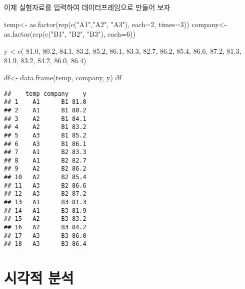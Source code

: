 \documentclass[
]{book}
\newenvironment{Shaded}{\begin{snugshade}}{\end{snugshade}}
\newcommand{\AttributeTok}[1]{\textcolor[rgb]{0.77,0.63,0.00}{#1}}
\newcommand{\DecValTok}[1]{\textcolor[rgb]{0.00,0.00,0.81}{#1}}
\newcommand{\FloatTok}[1]{\textcolor[rgb]{0.00,0.00,0.81}{#1}}
\newcommand{\FunctionTok}[1]{\textcolor[rgb]{0.00,0.00,0.00}{#1}}
\newcommand{\NormalTok}[1]{#1}
\newcommand{\OtherTok}[1]{\textcolor[rgb]{0.56,0.35,0.01}{#1}}
\newcommand{\StringTok}[1]{\textcolor[rgb]{0.31,0.60,0.02}{#1}}
\begin{document}
이제 실험자료를 입력하여 데이터프레임으로 만들어 보자

\begin{Shaded}
\begin{Highlighting}[]
\NormalTok{temp}\OtherTok{\textless{}{-}} \FunctionTok{as.factor}\NormalTok{(}\FunctionTok{rep}\NormalTok{(}\FunctionTok{c}\NormalTok{(}\StringTok{"A1"}\NormalTok{,}\StringTok{"A2"}\NormalTok{, }\StringTok{"A3"}\NormalTok{), }\AttributeTok{each=}\DecValTok{2}\NormalTok{, }\AttributeTok{times=}\DecValTok{3}\NormalTok{))}
\NormalTok{company}\OtherTok{\textless{}{-}} \FunctionTok{as.factor}\NormalTok{(}\FunctionTok{rep}\NormalTok{(}\FunctionTok{c}\NormalTok{(}\StringTok{"B1"}\NormalTok{, }\StringTok{"B2"}\NormalTok{, }\StringTok{"B3"}\NormalTok{), }\AttributeTok{each=}\DecValTok{6}\NormalTok{))}

\NormalTok{y }\OtherTok{\textless{}{-}}\FunctionTok{c}\NormalTok{( }\FloatTok{81.0}\NormalTok{, }\FloatTok{80.2}\NormalTok{, }\FloatTok{84.1}\NormalTok{, }\FloatTok{83.2}\NormalTok{, }\FloatTok{85.2}\NormalTok{, }\FloatTok{86.1}\NormalTok{,}
       \FloatTok{83.3}\NormalTok{, }\FloatTok{82.7}\NormalTok{, }\FloatTok{86.2}\NormalTok{, }\FloatTok{85.4}\NormalTok{, }\FloatTok{86.6}\NormalTok{, }\FloatTok{87.2}\NormalTok{,}
       \FloatTok{81.3}\NormalTok{, }\FloatTok{81.9}\NormalTok{, }\FloatTok{83.2}\NormalTok{, }\FloatTok{84.2}\NormalTok{, }\FloatTok{86.0}\NormalTok{, }\FloatTok{86.4}\NormalTok{) }

\NormalTok{df}\OtherTok{\textless{}{-}} \FunctionTok{data.frame}\NormalTok{(temp, company, y)}
\NormalTok{df}
\end{Highlighting}
\end{Shaded}

\begin{verbatim}
##    temp company    y
## 1    A1      B1 81.0
## 2    A1      B1 80.2
## 3    A2      B1 84.1
## 4    A2      B1 83.2
## 5    A3      B1 85.2
## 6    A3      B1 86.1
## 7    A1      B2 83.3
## 8    A1      B2 82.7
## 9    A2      B2 86.2
## 10   A2      B2 85.4
## 11   A3      B2 86.6
## 12   A3      B2 87.2
## 13   A1      B3 81.3
## 14   A1      B3 81.9
## 15   A2      B3 83.2
## 16   A2      B3 84.2
## 17   A3      B3 86.0
## 18   A3      B3 86.4
\end{verbatim}

\hypertarget{uxc2dcuxac01uxc801-uxbd84uxc11d-2}{%
\section{시각적 분석}\label{uxc2dcuxac01uxc801-uxbd84uxc11d-2}}
\end{document}
